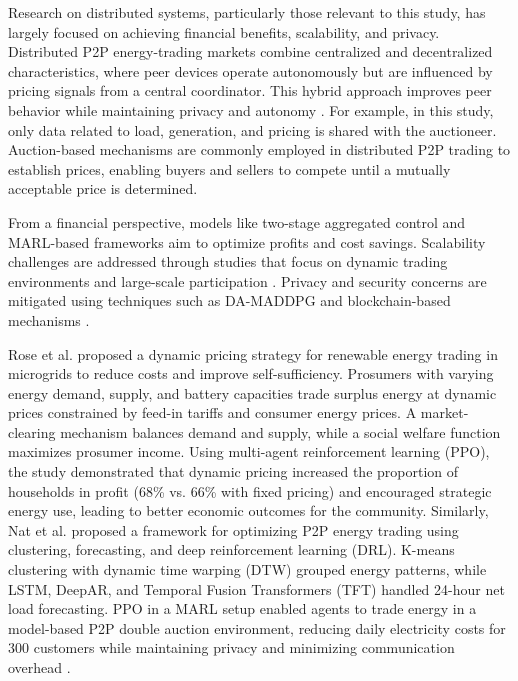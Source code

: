 \documentclass[preprint,12pt]{elsarticle}
\begin{document}
Research on distributed systems, particularly those relevant to this study, has largely focused on achieving financial benefits, scalability, and privacy. Distributed P2P energy-trading markets combine centralized and decentralized characteristics, where peer devices operate autonomously but are influenced by pricing signals from a central coordinator. This hybrid approach improves peer behavior while maintaining privacy and autonomy \cite{shah2024multi}. For example, in this study, only data related to load, generation, and pricing is shared with the auctioneer. Auction-based mechanisms are commonly employed in distributed P2P trading to establish prices, enabling buyers and sellers to compete until a mutually acceptable price is determined.

From a financial perspective, models like two-stage aggregated control \cite{long2018peer} and MARL-based frameworks \cite{pu2022peer} aim to optimize profits and cost savings. Scalability challenges are addressed through studies that focus on dynamic trading environments and large-scale participation \cite{qiu2022mean, charbonnier2022scalable}. Privacy and security concerns are mitigated using techniques such as DA-MADDPG \cite{qiu2021multi} and blockchain-based mechanisms \cite{abdelaziz2024blockchain}.

Rose et al. \cite{may2023multi} proposed a dynamic pricing strategy for renewable energy trading in microgrids to reduce costs and improve self-sufficiency. Prosumers with varying energy demand, supply, and battery capacities trade surplus energy at dynamic prices constrained by feed-in tariffs and consumer energy prices. A market-clearing mechanism balances demand and supply, while a social welfare function maximizes prosumer income. Using multi-agent reinforcement learning (PPO), the study demonstrated that dynamic pricing increased the proportion of households in profit (68\% vs. 66\% with fixed pricing) and encouraged strategic energy use, leading to better economic outcomes for the community. Similarly, Nat et al. \cite{uthayansuthi2024optimization} proposed a framework for optimizing P2P energy trading using clustering, forecasting, and deep reinforcement learning (DRL). K-means clustering with dynamic time warping (DTW) grouped energy patterns, while LSTM, DeepAR, and Temporal Fusion Transformers (TFT) handled 24-hour net load forecasting. PPO in a MARL setup enabled agents to trade energy in a model-based P2P double auction environment, reducing daily electricity costs for 300 customers while maintaining privacy and minimizing communication overhead \cite{uthayansuthi2024optimization}.
\end{document}
